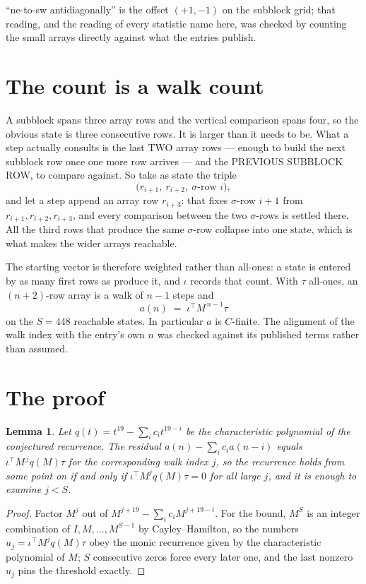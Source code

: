 \documentclass[11pt,a4paper]{article}
\theoremstyle{plain}
\newtheorem{lemma}[theorem]{Lemma}
\theoremstyle{definition}
\begin{document}
``ne-to-sw antidiagonally'' is the offset $(+1,-1)$ on the subblock grid; that reading, and
the reading of every statistic name here, was checked by counting the small arrays directly
against what the entries publish.

\section{The count is a walk count}

A subblock spans three array rows and the vertical comparison spans four, so the obvious state
is three consecutive rows. It is larger than it needs to be. What a step actually consults is
the last TWO array rows --- enough to build the next subblock row once one more row arrives ---
and the PREVIOUS SUBBLOCK ROW, to compare against. So take as state the triple
\[
\bigl(r_{i+1},\ r_{i+2},\ \sigma\text{-row }i\bigr),
\]
and let a step append an array row $r_{i+3}$: that fixes $\sigma$-row $i+1$ from
$r_{i+1},r_{i+2},r_{i+3}$, and every comparison between the two $\sigma$-rows is settled
there. All the third rows that produce the same $\sigma$-row collapse into one state, which is
what makes the wider arrays reachable.

The starting vector is therefore weighted rather than all-ones: a state is entered by as many
first rows as produce it, and $\iota$ records that count. With $\tau$ all-ones, an
$(n+2)$-row array is a walk of $n-1$ steps and
\[
a(n)\;=\;\iota^{\!\top}M^{\,n-1}\tau
\]
on the $S=448$ reachable states. In particular $a$ is $C$-finite. The alignment of the walk
index with the entry's own $n$ was checked against its published terms rather than assumed.

\section{The proof}

\begin{lemma}\label{lem:crit}
Let $q(t)=t^{19}-\sum_i c_it^{19-i}$ be the characteristic polynomial of the
conjectured recurrence. The residual $a(n)-\sum_ic_ia(n-i)$ equals
$\iota^{\!\top}M^{\,j}q(M)\tau$ for the corresponding walk index $j$, so the recurrence
holds from some point on if and only if $\iota^{\!\top}M^{j}q(M)\tau=0$ for all large $j$,
and it is enough to examine $j<S$.
\end{lemma}

\begin{proof}
Factor $M^{j}$ out of $M^{j+19}-\sum_ic_iM^{j+19-i}$. For the bound, $M^{S}$
is an integer combination of $I,M,\dots,M^{S-1}$ by Cayley--Hamilton, so the numbers
$u_j=\iota^{\!\top}M^{j}q(M)\tau$ obey the monic recurrence given by the characteristic
polynomial of $M$; $S$ consecutive zeros force every later one, and the last nonzero $u_j$
pins the threshold exactly.
\end{proof}
\end{document}
